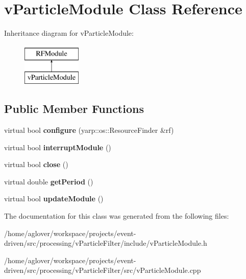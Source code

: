 \hypertarget{classvParticleModule}{}\section{v\+Particle\+Module Class Reference}
\label{classvParticleModule}
Inheritance diagram for v\+Particle\+Module\+:\begin{figure}[H]
\begin{center}
\leavevmode
\includegraphics[height=2.000000cm]{classvParticleModule}
\end{center}
\end{figure}
\subsection*{Public Member Functions}
\begin{DoxyCompactItemize}
\item 
virtual bool {\bfseries configure} (yarp\+::os\+::\+Resource\+Finder \&rf)\hypertarget{classvParticleModule_a50220d0e8c348cbb887924def82ec78b}{}\label{classvParticleModule_a50220d0e8c348cbb887924def82ec78b}

\item 
virtual bool {\bfseries interrupt\+Module} ()\hypertarget{classvParticleModule_ae0dbee0680f7006c09a2413d13cbb4fb}{}\label{classvParticleModule_ae0dbee0680f7006c09a2413d13cbb4fb}

\item 
virtual bool {\bfseries close} ()\hypertarget{classvParticleModule_a622f526fc7e2e194b301ff1fa6a362bb}{}\label{classvParticleModule_a622f526fc7e2e194b301ff1fa6a362bb}

\item 
virtual double {\bfseries get\+Period} ()\hypertarget{classvParticleModule_acee72c3ad5f6eddb580fbf57f0cb9d7e}{}\label{classvParticleModule_acee72c3ad5f6eddb580fbf57f0cb9d7e}

\item 
virtual bool {\bfseries update\+Module} ()\hypertarget{classvParticleModule_ae1973b925b09372518b4922b8f033363}{}\label{classvParticleModule_ae1973b925b09372518b4922b8f033363}

\end{DoxyCompactItemize}


The documentation for this class was generated from the following files\+:\begin{DoxyCompactItemize}
\item 
/home/aglover/workspace/projects/event-\/driven/src/processing/v\+Particle\+Filter/include/v\+Particle\+Module.\+h\item 
/home/aglover/workspace/projects/event-\/driven/src/processing/v\+Particle\+Filter/src/v\+Particle\+Module.\+cpp\end{DoxyCompactItemize}
